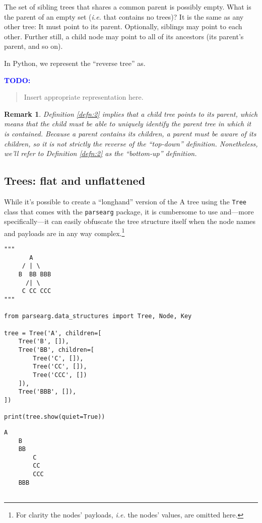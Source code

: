 \documentclass[10pt]{amsart}
\numberwithin{equation}{section}
\newtheorem{remark}{Remark}[section]
\begin{document}
The set of sibling trees that shares a common parent is possibly empty. What is
the parent of an empty set (\emph{i.e.} that contains no trees)? It is the same as 
any other tree: It must point to its parent. Optionally, siblings may point
to each other. Further still, a child node may point to all of its ancestors
(its parent's parent, and so on).

In Python, we represent the ``reverse tree'' as.

\textcolor{blue}{\bf TODO:}
\begin{quote}
Insert appropriate representation here. 
\end{quote}

\begin{remark}
Definition \ref{defn:2} implies that a child tree points to its parent, which means
that the child must be able to uniquely identify the parent tree in which
it is contained. Because a parent contains its children, a parent must
be aware of its children, so it is not strictly the reverse of the 
``top-down'' definition. Nonetheless, we'll refer to Definition 
\ref{defn:2} as the ``bottom-up'' definition.
\end{remark}

\subsection{Trees: flat and unflattened}
\label{sec:org1e68290}
While it's possible to create a ``longhand'' version of the A tree using the 
\texttt{Tree} class that comes with the \texttt{parsearg} package, 
it is cumbersome to use and---more specifically---it can 
easily obfuscate the tree structure itself when the node names and 
payloads are in any way complex.\footnote{For clarity the nodes' payloads, \emph{i.e.} the nodes' values, are omitted here.} 
\begin{verbatim}
"""
       A
     / | \
    B  BB BBB
      /| \
     C CC CCC
"""

from parsearg.data_structures import Tree, Node, Key

tree = Tree('A', children=[
    Tree('B', []),
    Tree('BB', children=[
        Tree('C', []),
        Tree('CC', []),
        Tree('CCC', [])
    ]),
    Tree('BBB', []),
])

print(tree.show(quiet=True))
\end{verbatim}

\begin{verbatim}
A
    B
    BB
        C
        CC
        CCC
    BBB


\end{verbatim}
\end{document}
